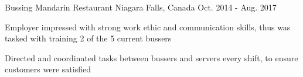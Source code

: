 \begin{cventries}
  \cventry
    {Bussing}
    {Mandarin Restaurant}
    {Niagara Falls, Canada}
    {Oct. 2014 - Aug. 2017}
    {
      \begin{cvitems}
        \item {Employer impressed with strong work ethic and communication skills, thus was tasked with training 2 of the 5 current bussers}
        \item{Directed and coordinated tasks between bussers and servers every shift, to ensure customers were satisfied}
      \end{cvitems}
    }

\end{cventries}
